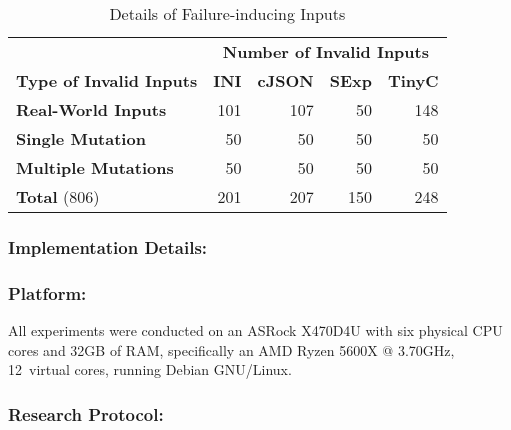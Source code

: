 \documentclass[sigconf,review,anonymous]{acmart}
\newcounter{todocounter}
\newcommand{\todo}[1]{\marginpar{$|$}\textcolor{red}{\stepcounter{todocounter}\footnote[\thetodocounter]{\textcolor{red}{\textbf{TODO }}\textit{#1}}}}
\renewcommand{\todo}[1]{}
\begin{document}
\begin{table}[!tbp]\centering
\caption{Details of Failure-inducing Inputs}
\begin{tabular}{|l | r | r | r | r |}
\hline
&  \multicolumn{4}{c|}{\textbf{Number of Invalid Inputs}}  \\
\textbf{Type of Invalid Inputs} & \textbf{INI} & \textbf{cJSON} & \textbf{SExp} & \textbf{TinyC} \\
\hline
\textbf{Real-World Inputs} & 101 & 107 & 50 & 148 \\
\textbf{Single Mutation} & 50 & 50 & 50 & 50 \\
\textbf{Multiple Mutations} & 50 & 50 & 50 & 50 \\
\hline
\textbf{Total } (806) & 201 & 207 & 150 & 248 \\
\hline
\end{tabular}
\label{tab:input-details}
\end{table}
\subsubsection*{\bf Implementation Details:}

\subsubsection*{\bf Platform:} All experiments were conducted
on an ASRock X470D4U with six physical CPU cores %
and 32GB of RAM, specifically an AMD Ryzen 5600X @ 3.70GHz, 12~virtual cores, running Debian GNU/Linux.


\subsubsection*{\bf Research Protocol:}\todo{we should mention the four minute timeout here ... }
\end{document}

